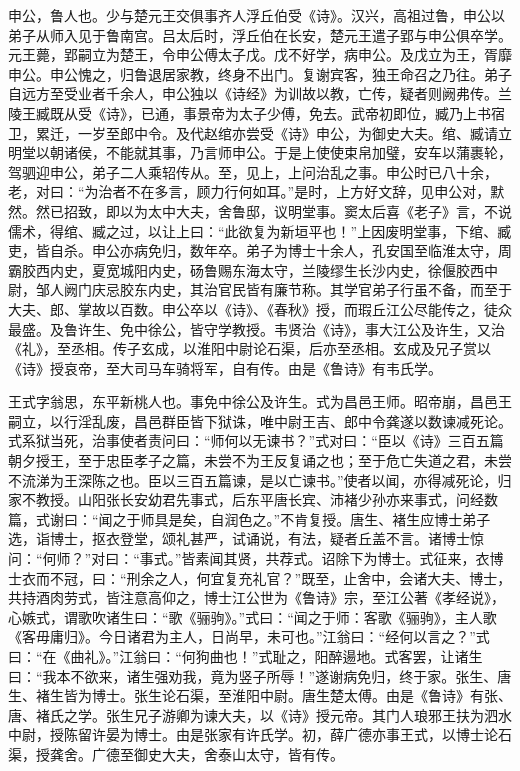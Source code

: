 \documentclass[12pt,UTF8]{ctexbook}
\begin{document}
申公，鲁人也。少与楚元王交俱事齐人浮丘伯受《诗》。汉兴，高祖过鲁，申公以弟子从师入见于鲁南宫。吕太后时，浮丘伯在长安，楚元王遣子郢与申公俱卒学。元王薨，郢嗣立为楚王，令申公傅太子戊。戊不好学，病申公。及戊立为王，胥靡申公。申公愧之，归鲁退居家教，终身不出门。复谢宾客，独王命召之乃往。弟子自远方至受业者千余人，申公独以《诗经》为训故以教，亡传，疑者则阙弗传。兰陵王臧既从受《诗》，已通，事景帝为太子少傅，免去。武帝初即位，臧乃上书宿卫，累迁，一岁至郎中令。及代赵绾亦尝受《诗》申公，为御史大夫。绾、臧请立明堂以朝诸侯，不能就其事，乃言师申公。于是上使使束帛加璧，安车以蒲裹轮，驾驷迎申公，弟子二人乘轺传从。至，见上，上问治乱之事。申公时已八十余，老，对曰：“为治者不在多言，顾力行何如耳。”是时，上方好文辞，见申公对，默然。然已招致，即以为太中大夫，舍鲁邸，议明堂事。窦太后喜《老子》言，不说儒术，得绾、臧之过，以让上曰：“此欲复为新垣平也！”上因废明堂事，下绾、臧吏，皆自杀。申公亦病免归，数年卒。弟子为博士十余人，孔安国至临淮太守，周霸胶西内史，夏宽城阳内史，砀鲁赐东海太守，兰陵缪生长沙内史，徐偃胶西中尉，邹人阙门庆忌胶东内史，其治官民皆有廉节称。其学官弟子行虽不备，而至于大夫、郎、掌故以百数。申公卒以《诗》、《春秋》授，而瑕丘江公尽能传之，徒众最盛。及鲁许生、免中徐公，皆守学教授。韦贤治《诗》，事大江公及许生，又治《礼》，至丞相。传子玄成，以淮阳中尉论石渠，后亦至丞相。玄成及兄子赏以《诗》授哀帝，至大司马车骑将军，自有传。由是《鲁诗》有韦氏学。



王式字翁思，东平新桃人也。事免中徐公及许生。式为昌邑王师。昭帝崩，昌邑王嗣立，以行淫乱废，昌邑群臣皆下狱诛，唯中尉王吉、郎中令龚遂以数谏减死论。式系狱当死，治事使者责问曰：“师何以无谏书？”式对曰：“臣以《诗》三百五篇朝夕授王，至于忠臣孝子之篇，未尝不为王反复诵之也；至于危亡失道之君，未尝不流涕为王深陈之也。臣以三百五篇谏，是以亡谏书。”使者以闻，亦得减死论，归家不教授。山阳张长安幼君先事式，后东平唐长宾、沛褚少孙亦来事式，问经数篇，式谢曰：“闻之于师具是矣，自润色之。”不肯复授。唐生、褚生应博士弟子选，诣博士，抠衣登堂，颂礼甚严，试诵说，有法，疑者丘盖不言。诸博士惊问：“何师？”对曰：“事式。”皆素闻其贤，共荐式。诏除下为博士。式征来，衣博士衣而不冠，曰：“刑余之人，何宜复充礼官？”既至，止舍中，会诸大夫、博士，共持酒肉劳式，皆注意高仰之，博士江公世为《鲁诗》宗，至江公著《孝经说》，心嫉式，谓歌吹诸生曰：“歌《骊驹》。”式曰：“闻之于师：客歌《骊驹》，主人歌《客毋庸归》。今日诸君为主人，日尚早，未可也。”江翁曰：“经何以言之？”式曰：“在《曲礼》。”江翁曰：“何狗曲也！”式耻之，阳醉逿地。式客罢，让诸生曰：“我本不欲来，诸生强劝我，竟为竖子所辱！”遂谢病免归，终于家。张生、唐生、褚生皆为博士。张生论石渠，至淮阳中尉。唐生楚太傅。由是《鲁诗》有张、唐、褚氏之学。张生兄子游卿为谏大夫，以《诗》授元帝。其门人琅邪王扶为泗水中尉，授陈留许晏为博士。由是张家有许氏学。初，薛广德亦事王式，以博士论石渠，授龚舍。广德至御史大夫，舍泰山太守，皆有传。
\end{document}
